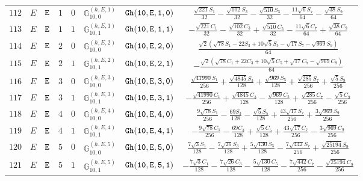 \documentclass[fleqn,8pt]{jsarticle}
\begin{document}
\begin{table}[ht!]
\begin{center}
\begin{tabular}{cccccccc}
$ 112 $ & $ E $ & $ {\tt E} $ & $ 1 $ & $ 0 $ & $ \mathbb{G}_{10,0}^{(h,E,1)} $ & $ {\tt Gh(10,E,1,0)} $ & $ \frac{\sqrt{221} S_{1}}{32} - \frac{\sqrt{102} S_{3}}{32} - \frac{\sqrt{510} S_{5}}{32} - \frac{11 \sqrt{6} S_{7}}{64} - \frac{\sqrt{38} S_{9}}{64} $ \\
$ 113 $ & $ E $ & $ {\tt E} $ & $ 1 $ & $ 1 $ & $ \mathbb{G}_{10,1}^{(h,E,1)} $ & $ {\tt Gh(10,E,1,1)} $ & $ - \frac{\sqrt{221} C_{1}}{32} - \frac{\sqrt{102} C_{3}}{32} + \frac{\sqrt{510} C_{5}}{32} - \frac{11 \sqrt{6} C_{7}}{64} + \frac{\sqrt{38} C_{9}}{64} $ \\
$ 114 $ & $ E $ & $ {\tt E} $ & $ 2 $ & $ 0 $ & $ \mathbb{G}_{10,0}^{(h,E,2)} $ & $ {\tt Gh(10,E,2,0)} $ & $ \frac{\sqrt{2} \left(\sqrt{78} S_{1} - 22 S_{3} + 10 \sqrt{5} S_{5} - \sqrt{17} S_{7} - \sqrt{969} S_{9}\right)}{64} $ \\
$ 115 $ & $ E $ & $ {\tt E} $ & $ 2 $ & $ 1 $ & $ \mathbb{G}_{10,1}^{(h,E,2)} $ & $ {\tt Gh(10,E,2,1)} $ & $ - \frac{\sqrt{2} \left(\sqrt{78} C_{1} + 22 C_{3} + 10 \sqrt{5} C_{5} + \sqrt{17} C_{7} - \sqrt{969} C_{9}\right)}{64} $ \\
$ 116 $ & $ E $ & $ {\tt E} $ & $ 3 $ & $ 0 $ & $ \mathbb{G}_{10,0}^{(h,E,3)} $ & $ {\tt Gh(10,E,3,0)} $ & $ \frac{\sqrt{41990} S_{1}}{256} + \frac{\sqrt{4845} S_{3}}{128} + \frac{\sqrt{969} S_{5}}{128} + \frac{\sqrt{285} S_{7}}{256} + \frac{\sqrt{5} S_{9}}{256} $ \\
$ 117 $ & $ E $ & $ {\tt E} $ & $ 3 $ & $ 1 $ & $ \mathbb{G}_{10,1}^{(h,E,3)} $ & $ {\tt Gh(10,E,3,1)} $ & $ - \frac{\sqrt{41990} C_{1}}{256} + \frac{\sqrt{4845} C_{3}}{128} - \frac{\sqrt{969} C_{5}}{128} + \frac{\sqrt{285} C_{7}}{256} - \frac{\sqrt{5} C_{9}}{256} $ \\
$ 118 $ & $ E $ & $ {\tt E} $ & $ 4 $ & $ 0 $ & $ \mathbb{G}_{10,0}^{(h,E,4)} $ & $ {\tt Gh(10,E,4,0)} $ & $ \frac{9 \sqrt{78} S_{1}}{256} - \frac{69 S_{3}}{128} - \frac{\sqrt{5} S_{5}}{128} + \frac{43 \sqrt{17} S_{7}}{256} + \frac{3 \sqrt{969} S_{9}}{256} $ \\
$ 119 $ & $ E $ & $ {\tt E} $ & $ 4 $ & $ 1 $ & $ \mathbb{G}_{10,1}^{(h,E,4)} $ & $ {\tt Gh(10,E,4,1)} $ & $ - \frac{9 \sqrt{78} C_{1}}{256} - \frac{69 C_{3}}{128} + \frac{\sqrt{5} C_{5}}{128} + \frac{43 \sqrt{17} C_{7}}{256} - \frac{3 \sqrt{969} C_{9}}{256} $ \\
$ 120 $ & $ E $ & $ {\tt E} $ & $ 5 $ & $ 0 $ & $ \mathbb{G}_{10,0}^{(h,E,5)} $ & $ {\tt Gh(10,E,5,0)} $ & $ \frac{7 \sqrt{3} S_{1}}{128} - \frac{7 \sqrt{26} S_{3}}{128} + \frac{5 \sqrt{130} S_{5}}{128} - \frac{7 \sqrt{442} S_{7}}{256} + \frac{\sqrt{25194} S_{9}}{256} $ \\
$ 121 $ & $ E $ & $ {\tt E} $ & $ 5 $ & $ 1 $ & $ \mathbb{G}_{10,1}^{(h,E,5)} $ & $ {\tt Gh(10,E,5,1)} $ & $ - \frac{7 \sqrt{3} C_{1}}{128} - \frac{7 \sqrt{26} C_{3}}{128} - \frac{5 \sqrt{130} C_{5}}{128} - \frac{7 \sqrt{442} C_{7}}{256} - \frac{\sqrt{25194} C_{9}}{256} $ \\
 \hline \hline
\end{tabular}
\end{center}
\end{table}
\end{document}
